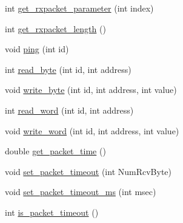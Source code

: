 \begin{DoxyCompactItemize}
\item 
int \hyperlink{classdynamixel_a68b5fa99719a9aec0734ecfb0635503b}{get\+\_\+rxpacket\+\_\+parameter} (int index)
\item 
int \hyperlink{classdynamixel_ae9cc18fdeda8329f68fa0f2f0a7a9aba}{get\+\_\+rxpacket\+\_\+length} ()
\item 
void \hyperlink{classdynamixel_af2bd714423e7c4fc089762805c0c71f3}{ping} (int id)
\item 
int \hyperlink{classdynamixel_a888404b41c4c4395a0b745c77ff2cea9}{read\+\_\+byte} (int id, int address)
\item 
void \hyperlink{classdynamixel_a66c1e32cc45dd46d329f1fc212e46a3d}{write\+\_\+byte} (int id, int address, int value)
\item 
int \hyperlink{classdynamixel_a45e99341e82c5114f6e829c9141bf96f}{read\+\_\+word} (int id, int address)
\item 
void \hyperlink{classdynamixel_a925f62ce5e261e5ef4fe6dc46bdc7c63}{write\+\_\+word} (int id, int address, int value)
\item 
double \hyperlink{classdynamixel_a2fa5375537184c279a9ebfcfc0425071}{get\+\_\+packet\+\_\+time} ()
\item 
void \hyperlink{classdynamixel_a067f82c21ed176e18fa224d16f3d1c5b}{set\+\_\+packet\+\_\+timeout} (int Num\+Rcv\+Byte)
\item 
void \hyperlink{classdynamixel_a125b42f776c4aac520f274074f68b591}{set\+\_\+packet\+\_\+timeout\+\_\+ms} (int msec)
\item 
int \hyperlink{classdynamixel_afddd976dbc486cd08b92e0e6e4117519}{is\+\_\+packet\+\_\+timeout} ()
\end{DoxyCompactItemize}
